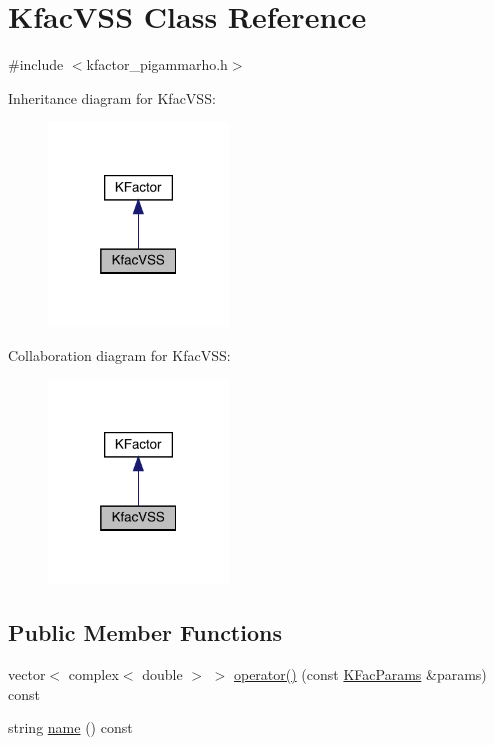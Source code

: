 \hypertarget{classKfacVSS}{}\section{Kfac\+V\+SS Class Reference}
\label{classKfacVSS}


{\ttfamily \#include $<$kfactor\+\_\+pigammarho.\+h$>$}



Inheritance diagram for Kfac\+V\+SS\+:\nopagebreak
\begin{figure}[H]
\begin{center}
\leavevmode
\includegraphics[width=136pt]{d5/d15/classKfacVSS__inherit__graph}
\end{center}
\end{figure}


Collaboration diagram for Kfac\+V\+SS\+:\nopagebreak
\begin{figure}[H]
\begin{center}
\leavevmode
\includegraphics[width=136pt]{db/d7b/classKfacVSS__coll__graph}
\end{center}
\end{figure}
\subsection*{Public Member Functions}
\begin{DoxyCompactItemize}
\item 
vector$<$ complex$<$ double $>$ $>$ \mbox{\hyperlink{classKfacVSS_a608b90a0b3fcdd1126e63c4ef68ce3e1}{operator()}} (const \mbox{\hyperlink{classKFacParams}{K\+Fac\+Params}} \&params) const
\item 
string \mbox{\hyperlink{classKfacVSS_a12bff0a61d6252df4e362d35c907a877}{name}} () const
\end{DoxyCompactItemize}



